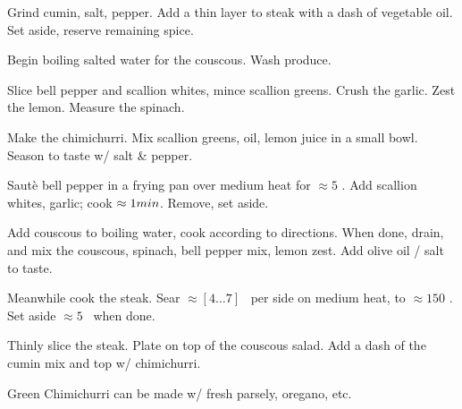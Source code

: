 \begin{preparation}
\item Grind cumin, salt, pepper.
	Add a thin layer to steak with a dash of vegetable oil.
	Set aside, reserve remaining spice.

\item Begin boiling salted water for the couscous.
	Wash produce.

\item Slice bell pepper and scallion whites, mince scallion greens.
	Crush the garlic.
	Zest the lemon.
	Measure the spinach.

\item Make the chimichurri.
	Mix scallion greens, oil, lemon juice in a small bowl.
	Season to taste w/ salt \& pepper.

\item Saut\`{e} bell pepper in a frying pan over medium heat for $\approx 5$ \minute.
	Add scallion whites, garlic; cook $\approx 1 \minute$.
	Remove, set aside.

\item Add couscous to boiling water, cook according to directions.
	When done, drain, and mix the couscous, spinach, bell pepper mix, lemon zest.
	Add olive oil / salt to taste.

\item Meanwhile cook the steak.
	Sear $\approx [4 \dots 7]$ \minute~per side on medium heat, to $\approx 150$ \Fahrenheit.
	Set aside $\approx 5$ \minute~when done.

\item Thinly slice the steak.
	Plate on top of the couscous salad.
	Add a dash of the cumin mix and top w/ chimichurri.
\end{preparation}


\begin{variation}
\item Green Chimichurri can be made w/ fresh parsely, oregano, etc.
\end{variation}


\recipeend
